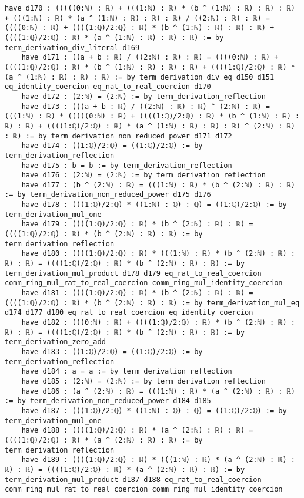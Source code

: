 \documentclass{article}
\begin{document}
\begin{tcolorbox}[colback=white!10, width=\linewidth]
\begin{lstlisting}[language=Lean4]
    have d170 : (((((0:ℕ) : ℝ) + (((1:ℕ) : ℝ) * (b ^ (1:ℕ) : ℝ) : ℝ) : ℝ) + (((1:ℕ) : ℝ) * (a ^ (1:ℕ) : ℝ) : ℝ) : ℝ) / ((2:ℕ) : ℝ) : ℝ) = ((((0:ℕ) : ℝ) + ((((1:ℚ)/2:ℚ) : ℝ) * (b ^ (1:ℕ) : ℝ) : ℝ) : ℝ) + ((((1:ℚ)/2:ℚ) : ℝ) * (a ^ (1:ℕ) : ℝ) : ℝ) : ℝ) := by term_derivation_div_literal d169
    have d171 : ((a + b : ℝ) / ((2:ℕ) : ℝ) : ℝ) = ((((0:ℕ) : ℝ) + ((((1:ℚ)/2:ℚ) : ℝ) * (b ^ (1:ℕ) : ℝ) : ℝ) : ℝ) + ((((1:ℚ)/2:ℚ) : ℝ) * (a ^ (1:ℕ) : ℝ) : ℝ) : ℝ) := by term_derivation_div_eq d150 d151 eq_identity_coercion eq_nat_to_real_coercion d170
    have d172 : (2:ℕ) = (2:ℕ) := by term_derivation_reflection
    have d173 : (((a + b : ℝ) / ((2:ℕ) : ℝ) : ℝ) ^ (2:ℕ) : ℝ) = (((1:ℕ) : ℝ) * (((((0:ℕ) : ℝ) + ((((1:ℚ)/2:ℚ) : ℝ) * (b ^ (1:ℕ) : ℝ) : ℝ) : ℝ) + ((((1:ℚ)/2:ℚ) : ℝ) * (a ^ (1:ℕ) : ℝ) : ℝ) : ℝ) ^ (2:ℕ) : ℝ) : ℝ) := by term_derivation_non_reduced_power d171 d172
    have d174 : ((1:ℚ)/2:ℚ) = ((1:ℚ)/2:ℚ) := by term_derivation_reflection
    have d175 : b = b := by term_derivation_reflection
    have d176 : (2:ℕ) = (2:ℕ) := by term_derivation_reflection
    have d177 : (b ^ (2:ℕ) : ℝ) = (((1:ℕ) : ℝ) * (b ^ (2:ℕ) : ℝ) : ℝ) := by term_derivation_non_reduced_power d175 d176
    have d178 : (((1:ℚ)/2:ℚ) * ((1:ℕ) : ℚ) : ℚ) = ((1:ℚ)/2:ℚ) := by term_derivation_mul_one
    have d179 : ((((1:ℚ)/2:ℚ) : ℝ) * (b ^ (2:ℕ) : ℝ) : ℝ) = ((((1:ℚ)/2:ℚ) : ℝ) * (b ^ (2:ℕ) : ℝ) : ℝ) := by term_derivation_reflection
    have d180 : ((((1:ℚ)/2:ℚ) : ℝ) * (((1:ℕ) : ℝ) * (b ^ (2:ℕ) : ℝ) : ℝ) : ℝ) = ((((1:ℚ)/2:ℚ) : ℝ) * (b ^ (2:ℕ) : ℝ) : ℝ) := by term_derivation_mul_product d178 d179 eq_rat_to_real_coercion comm_ring_mul_rat_to_real_coercion comm_ring_mul_identity_coercion
    have d181 : ((((1:ℚ)/2:ℚ) : ℝ) * (b ^ (2:ℕ) : ℝ) : ℝ) = ((((1:ℚ)/2:ℚ) : ℝ) * (b ^ (2:ℕ) : ℝ) : ℝ) := by term_derivation_mul_eq d174 d177 d180 eq_rat_to_real_coercion eq_identity_coercion
    have d182 : (((0:ℕ) : ℝ) + ((((1:ℚ)/2:ℚ) : ℝ) * (b ^ (2:ℕ) : ℝ) : ℝ) : ℝ) = ((((1:ℚ)/2:ℚ) : ℝ) * (b ^ (2:ℕ) : ℝ) : ℝ) := by term_derivation_zero_add
    have d183 : ((1:ℚ)/2:ℚ) = ((1:ℚ)/2:ℚ) := by term_derivation_reflection
    have d184 : a = a := by term_derivation_reflection
    have d185 : (2:ℕ) = (2:ℕ) := by term_derivation_reflection
    have d186 : (a ^ (2:ℕ) : ℝ) = (((1:ℕ) : ℝ) * (a ^ (2:ℕ) : ℝ) : ℝ) := by term_derivation_non_reduced_power d184 d185
    have d187 : (((1:ℚ)/2:ℚ) * ((1:ℕ) : ℚ) : ℚ) = ((1:ℚ)/2:ℚ) := by term_derivation_mul_one
    have d188 : ((((1:ℚ)/2:ℚ) : ℝ) * (a ^ (2:ℕ) : ℝ) : ℝ) = ((((1:ℚ)/2:ℚ) : ℝ) * (a ^ (2:ℕ) : ℝ) : ℝ) := by term_derivation_reflection
    have d189 : ((((1:ℚ)/2:ℚ) : ℝ) * (((1:ℕ) : ℝ) * (a ^ (2:ℕ) : ℝ) : ℝ) : ℝ) = ((((1:ℚ)/2:ℚ) : ℝ) * (a ^ (2:ℕ) : ℝ) : ℝ) := by term_derivation_mul_product d187 d188 eq_rat_to_real_coercion comm_ring_mul_rat_to_real_coercion comm_ring_mul_identity_coercion

\end{lstlisting}
\end{tcolorbox}
\end{document}

